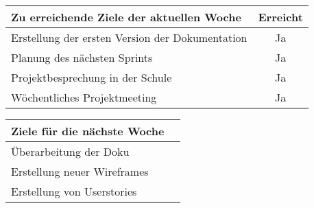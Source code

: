 \begin{tabularx}{\textwidth}{Xc}
    \arrayrulecolor{OliveGreen}
    \toprule
    {\bfseries Zu erreichende Ziele der aktuellen Woche} & {\bfseries Erreicht} \\
    \midrule[2pt]
    Erstellung der ersten Version der Dokumentation      &Ja                    \\
    \rowcolor{OliveGreen!15}
    Planung des nächsten Sprints                         &Ja                    \\
    \rowcolor{White}
    Projektbesprechung in der Schule                     &Ja                    \\
    \rowcolor{OliveGreen!15}
    Wöchentliches Projektmeeting                        &Ja                     \\
    \bottomrule[2pt]
\end{tabularx}
%
\vspace{1cm}
%
\begin{tabularx}{\textwidth}{Xc}
    \arrayrulecolor{OliveGreen}
    \toprule
    {\bfseries Ziele für die nächste Woche}              &                      \\
    \midrule[2pt]
    Überarbeitung der Doku                               &                      \\
    \rowcolor{OliveGreen!15}
    Erstellung neuer Wireframes                          &                      \\
    \rowcolor{White}
    Erstellung von Userstories                           &                      \\
\end{tabularx}
